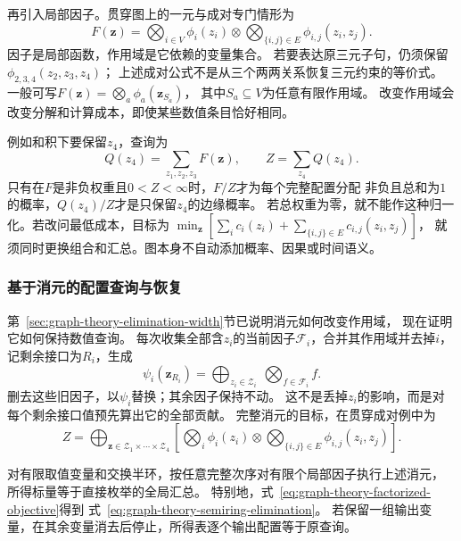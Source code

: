 再引入局部因子。贯穿图上的一元与成对专门情形为
\begin{equation}
  F(\bm z)=\bigotimes_{i\in V}\phi_i(z_i)
    \otimes\bigotimes_{\{i,j\}\in E}\phi_{i,j}(z_i,z_j).
  \label{eq:graph-theory-factorized-objective}
\end{equation}
因子是局部函数，作用域是它依赖的变量集合。
若要表达原三元子句，仍须保留\(\phi_{2,3,4}(z_2,z_3,z_4)\)；
上述成对公式不是从三个两两关系恢复三元约束的等价式。
一般可写\(F(\bm z)=\bigotimes_a\phi_a(\bm z_{S_a})\)，
其中\(S_a\subseteq V\)为任意有限作用域。
改变作用域会改变分解和计算成本，即使某些数值条目恰好相同。

例如和积下要保留\(z_4\)，查询为
\[
  Q(z_4)=\sum_{z_1,z_2,z_3}F(\bm z),\qquad
  Z=\sum_{z_4}Q(z_4).
\]
只有在\(F\)是非负权重且\(0<Z<\infty\)时，\(F/Z\)才为每个完整配置分配
非负且总和为\(1\)的概率，\(Q(z_4)/Z\)才是只保留\(z_4\)的边缘概率。
若总权重为零，就不能作这种归一化。若改问最低成本，目标为
\(\min_{\bm z}[\sum_i c_i(z_i)+\sum_{\{i,j\}\in E}c_{i,j}(z_i,z_j)]\)，
就须同时更换组合和汇总。图本身不自动添加概率、因果或时间语义。

\subsubsection{基于消元的配置查询与恢复}

第~\ref{sec:graph-theory-elimination-width}节已说明消元如何改变作用域，
现在证明它如何保持数值查询。
每次收集全部含\(z_i\)的当前因子\(\mathcal F_i\)，合并其作用域并去掉\(i\)，
记剩余接口为\(R_i\)，生成
\[
  \psi_i(\bm z_{R_i})
  =\bigoplus_{z_i\in\mathcal Z_i}\ \bigotimes_{f\in\mathcal F_i}f.
\]
删去这些旧因子，以\(\psi_i\)替换；其余因子保持不动。
这不是丢掉\(z_i\)的影响，而是对每个剩余接口值预先算出它的全部贡献。
完整消元的目标，在贯穿成对例中为
\begin{equation}
  Z=\bigoplus_{\bm z\in\mathcal Z_1\times\cdots\times\mathcal Z_4}
  \left[
    \bigotimes_i\phi_i(z_i)
    \otimes\bigotimes_{\{i,j\}\in E}\phi_{i,j}(z_i,z_j)
  \right].
  \label{eq:graph-theory-semiring-elimination}
\end{equation}

\begin{theorem}[半环变量消除的正确性]
  \label{thm:graph-theory-semiring-elimination}
  对有限取值变量和交换半环，按任意完整次序对有限个局部因子执行上述消元，
  所得标量等于直接枚举的全局汇总。
  特别地，式~\eqref{eq:graph-theory-factorized-objective}得到
  式~\eqref{eq:graph-theory-semiring-elimination}。
  若保留一组输出变量，在其余变量消去后停止，所得表逐个输出配置等于原查询。
\end{theorem}

